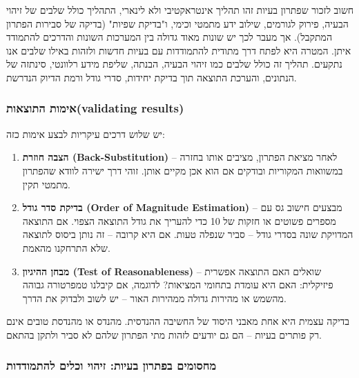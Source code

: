 \documentclass[
  hebrew,
  letterpaper,
  DIV=11,
  numbers=noendperiod]{scrreprt}
\begin{document}
{חשוב לזכור שפתרון בעיות זהו תהליך אינטראקטיבי ולא לינארי, התהליך כולל
שלבים של זיהוי הבעיה, פירוק לגורמים, שילוב ידע מתמטי וכימי, ו"בדיקת
שפיות" (בדיקה של סבירות הפתרון המתקבל). אך מעבר לכך יש שונות מאוד גדולה
בין המערכות השונות והדרכים להתמודד איתן. המטרה היא לפתח דרך מתודית
להתמודדות עם בעיות חדשות ולזהות באילו שלבים אנו נתקעים. תהליך זה כולל
שלבים כמו זיהוי הבעיה, הבנתה, שליפת מידע רלוונטי, סינתזה של הנתונים,
והערכת התוצאה תוך בדיקת יחידות, סדרי גודל ורמת הדיוק הנדרשת.}

\subsubsection{\texorpdfstring{{אימות התוצאות}(validating
results){}}{אימות התוצאות(validating results)}}\label{ux5d0ux5d9ux5deux5d5ux5ea-ux5d4ux5eaux5d5ux5e6ux5d0ux5d5ux5eavalidating-results}

{יש שלוש דרכים עיקריות לבצע אימות כזה}:

\begin{enumerate}
\def\labelenumi{\arabic{enumi}.}
\item
  \textbf{{הצבה חוזרת} (Back-Substitution)} -- {לאחר מציאת הפתרון,
  מציבים אותו בחזרה במשוואות המקוריות ובודקים אם הוא אכן מקיים אותן}.
  {זוהי דרך ישירה לוודא שהפתרון מתמטי תקין}.
\item
  \textbf{{בדיקת סדר גודל} (Order of Magnitude Estimation)} -- {מבצעים
  חישוב גס עם מספרים פשוטים או חזקות של 10 כדי להעריך את גודל התוצאה
  הצפוי}. {אם התוצאה המדויקת שונה בסדרי גודל -- סביר שנפלה טעות. אם היא
  קרובה -- זה נותן ביסוס לתוצאה שלא התרחקנו מהאמת}.
\item
  \textbf{{מבחן ההיגיון} (Test of Reasonableness)} -- {שואלים האם התוצאה
  אפשרית פיזיקלית: האם היא עומדת בתחומי המציאות}? {לדוגמה, אם קיבלנו
  טמפרטורה גבוהה מהשמש או מהירות גדולה ממהירות האור -- יש לשוב ולבדוק את
  הדרך}.
\end{enumerate}

{בדיקה עצמית היא אחת מאבני היסוד של החשיבה ההנדסית}. {מהנדס או מהנדסת
טובים אינם רק פותרים בעיות -- הם גם יודעים לזהות מתי הפתרון שלהם לא סביר
ולתקן בהתאם}.

\subsubsection{\texorpdfstring{{מחסומים בפתרון בעיות: זיהוי וכלים
להתמודדות}}{מחסומים בפתרון בעיות: זיהוי וכלים להתמודדות}}\label{ux5deux5d7ux5e1ux5d5ux5deux5d9ux5dd-ux5d1ux5e4ux5eaux5e8ux5d5ux5df-ux5d1ux5e2ux5d9ux5d5ux5ea-ux5d6ux5d9ux5d4ux5d5ux5d9-ux5d5ux5dbux5dcux5d9ux5dd-ux5dcux5d4ux5eaux5deux5d5ux5d3ux5d3ux5d5ux5ea}
\end{document}
